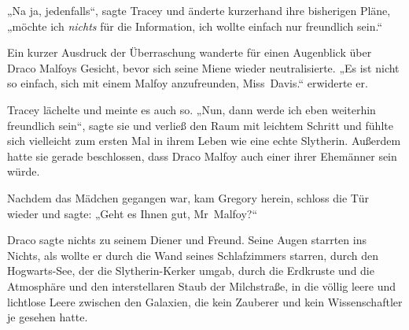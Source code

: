 „Na ja, jedenfalls“, sagte Tracey und änderte kurzerhand ihre bisherigen Pläne, „möchte ich \emph{nichts} für die Information, ich wollte einfach nur freundlich sein.“

Ein kurzer Ausdruck der Überraschung wanderte für einen Augenblick über Draco Malfoys Gesicht, bevor sich seine Miene wieder neutralisierte. „Es ist nicht so einfach, sich mit einem Malfoy anzufreunden, Miss~Davis.“ erwiderte er.

Tracey lächelte und meinte es auch so. „Nun, dann werde ich eben weiterhin freundlich sein“, sagte sie und verließ den Raum mit leichtem Schritt und fühlte sich vielleicht zum ersten Mal in ihrem Leben wie eine echte Slytherin. Außerdem hatte sie gerade beschlossen, dass Draco Malfoy auch einer ihrer Ehemänner sein würde.

\later

Nachdem das Mädchen gegangen war, kam Gregory herein, schloss die Tür wieder und sagte: „Geht es Ihnen gut, Mr~Malfoy?“

Draco sagte nichts zu seinem Diener und Freund. Seine Augen starrten ins Nichts, als wollte er durch die Wand seines Schlafzimmers starren, durch den Hogwarts-See, der die Slytherin-Kerker umgab, durch die Erdkruste und die Atmosphäre und den interstellaren Staub der Milchstraße, in die völlig leere und lichtlose Leere zwischen den Galaxien, die kein Zauberer und kein Wissenschaftler je gesehen hatte.

